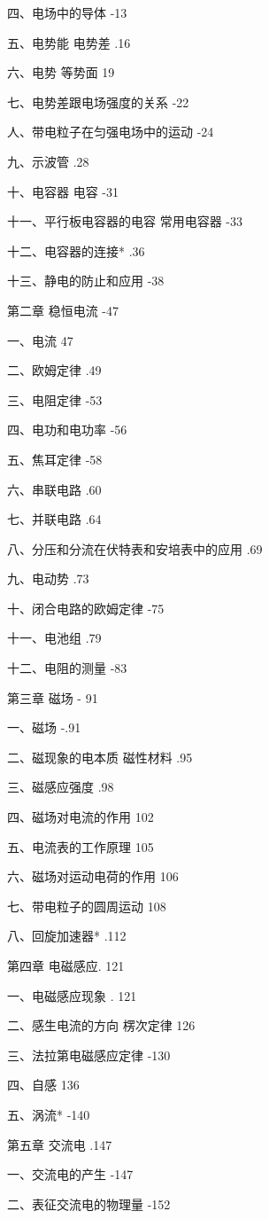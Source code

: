 \documentclass[10pt]{article}
\begin{document}
四、电场中的导体 -13

五、电势能 电势差 .16

六、电势 等势面 19

七、电势差跟电场强度的关系 -22

人、带电粒子在匀强电场中的运动 -24

九、示波管 .28

十、电容器 电容 -31

十一、平行板电容器的电容 常用电容器 -33

十二、电容器的连接* .36

十三、静电的防止和应用 -38

第二章 稳恒电流 -47

一、电流 47

二、欧姆定律 .49

三、电阻定律 -53

四、电功和电功率 -56

五、焦耳定律 -58

六、串联电路 .60

七、并联电路 .64

八、分压和分流在伏特表和安培表中的应用 .69

九、电动势 .73

十、闭合电路的欧姆定律 -75

十一、电池组 .79

十二、电阻的测量 -83

第三章 磁场 - 91

一、磁场 -.91

二、磁现象的电本质 磁性材料 .95

三、磁感应强度 .98

四、磁场对电流的作用 102

五、电流表的工作原理 105

六、磁场对运动电荷的作用 106

七、带电粒子的圆周运动 108

八、回旋加速器* .112

第四章 电磁感应. 121

一、电磁感应现象 . 121

二、感生电流的方向 楞次定律 126

三、法拉第电磁感应定律 -130

四、自感 136

五、涡流* -140

第五章 交流电 .147

一、交流电的产生 -147

二、表征交流电的物理量 -152
\end{document}
